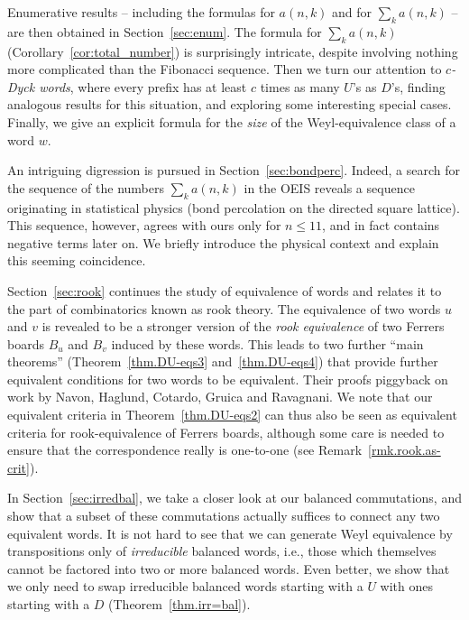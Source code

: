 \documentclass[numbers=enddot,12pt,final,onecolumn,notitlepage]{scrartcl}%
\theoremstyle{definition}
\begin{document}
Enumerative results -- including the formulas for $a(n,k)$ and for $\sum_k a(n,k)$ -- are then obtained in Section~\ref{sec:enum}.
The formula for $\sum_k a(n,k)$ (Corollary~\ref{cor:total_number}) is surprisingly intricate, despite involving nothing more complicated than the Fibonacci sequence.
Then we turn our attention to \textit{$c$-Dyck words}, where every prefix has at least $c$ times as many $U$'s as $D$'s,
finding analogous results for this situation, and exploring some interesting special cases.
Finally, we give an explicit formula for the \textit{size} of the Weyl-equivalence class of
a word $w$.

An intriguing digression is pursued in Section~\ref{sec:bondperc}. Indeed, a search for the sequence of the numbers $\sum_k a(n,k)$ in the OEIS reveals a sequence  \cite[A006727]{OEIS} originating in statistical physics (bond percolation on the directed square lattice).
This sequence, however, agrees with ours only for $n \leq 11$, and in fact contains negative terms later on.
We briefly introduce the physical context and explain this seeming coincidence.

Section~\ref{sec:rook} continues the study of equivalence of words and relates it to the part of combinatorics known as rook theory.
The equivalence of two words $u$ and $v$ is revealed to be a  stronger version of the \emph{rook equivalence} of two Ferrers boards $B_u$ and $B_v$ induced by these words.
This leads to two further ``main theorems'' (Theorem~\ref{thm.DU-eqs3} and~\ref{thm.DU-eqs4}) that provide further equivalent conditions for two words to be equivalent.
Their proofs piggyback on work by Navon, Haglund, Cotardo, Gruica and Ravagnani.
We note that our equivalent criteria in Theorem~\ref{thm.DU-eqs2} can thus also be seen as equivalent criteria for rook-equivalence of Ferrers boards, although some care is needed to ensure that the correspondence really is one-to-one (see Remark~\ref{rmk.rook.as-crit}).

In Section~\ref{sec:irredbal}, we take a closer look at our balanced commutations, and show that a subset of these commutations actually suffices to connect any two equivalent words.
It is not hard to see that we can generate Weyl equivalence by transpositions
only of \textit{irreducible} balanced words, i.e., those which themselves cannot be factored into two or
more balanced words.
Even better, we show that we only need to swap irreducible balanced words starting with a $U$ with ones starting with a $D$ (Theorem~\ref{thm.irr=bal}).
\end{document}
